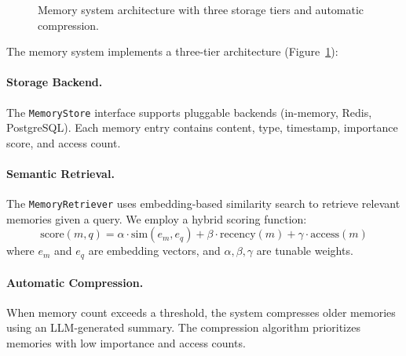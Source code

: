 \documentclass[11pt,twocolumn]{article}
\begin{document}
\begin{figure}[t]
\centering
{}
\caption{Memory system architecture with three storage tiers and automatic compression.}
\label{fig:memory}
\end{figure}

The memory system implements a three-tier architecture (Figure~\ref{fig:memory}):

\paragraph{Storage Backend.} The \texttt{MemoryStore} interface supports pluggable backends (in-memory, Redis, PostgreSQL). Each memory entry contains content, type, timestamp, importance score, and access count.

\paragraph{Semantic Retrieval.} The \texttt{MemoryRetriever} uses embedding-based similarity search to retrieve relevant memories given a query. We employ a hybrid scoring function:
\begin{equation}
    \text{score}(m, q) = \alpha \cdot \text{sim}(e_m, e_q) + \beta \cdot \text{recency}(m) + \gamma \cdot \text{access}(m)
\end{equation}
where $e_m$ and $e_q$ are embedding vectors, and $\alpha, \beta, \gamma$ are tunable weights.

\paragraph{Automatic Compression.} When memory count exceeds a threshold, the system compresses older memories using an LLM-generated summary. The compression algorithm prioritizes memories with low importance and access counts.
\end{document}
